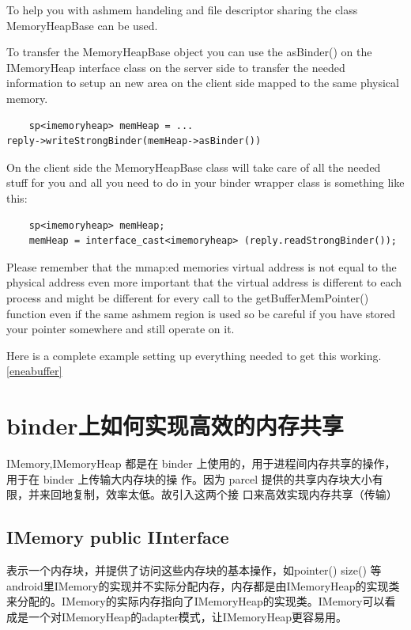 \documentclass[a4paper,11pt]{article}
\begin{document}
To help you with ashmem handeling and file descriptor sharing the class
MemoryHeapBase can be used. 

To transfer the MemoryHeapBase object you can use the asBinder() on the
IMemoryHeap interface class on the server side to transfer the needed
information to setup an new area on the client side mapped to the same
physical memory.
\begin{lstlisting}
    sp<imemoryheap> memHeap = ...
reply->writeStrongBinder(memHeap->asBinder())
\end{lstlisting}

On the client side the MemoryHeapBase class will take care of all the needed
stuff for you and all you need to do in your binder wrapper class is something
like this:
\begin{lstlisting}
    sp<imemoryheap> memHeap;
    memHeap = interface_cast<imemoryheap> (reply.readStrongBinder());
\end{lstlisting}
Please remember that the mmap:ed memories virtual address is not equal to the
physical address even more important that the virtual address is different to
each process and might be different for every call to the
getBufferMemPointer() function even if the same ashmem region is used so be
careful if you have stored your pointer somewhere and still operate on it.

Here is a complete example setting up everything needed to get this working.
\ref{eneabuffer}

\section{binder上如何实现高效的内存共享}
IMemory,IMemoryHeap 都是在 binder 上使用的，用于进程间内存共享的操作，用于在 binder 上传输大内存块的操
作。因为 parcel 提供的共享内存块大小有限，并来回地复制，效率太低。故引入这两个接
口来高效实现内存共享（传输）

\subsection{IMemory public IInterface}
表示一个内存块，并提供了访问这些内存块的基本操作，如pointer() size() 等
android里IMemory的实现并不实际分配内存，内存都是由IMemoryHeap的实现类来分配的。IMemory的实际内存指向了IMemoryHeap的实现类。IMemory可以看成是一个对IMemoryHeap的adapter模式，让IMemoryHeap更容易用。
\end{document}
